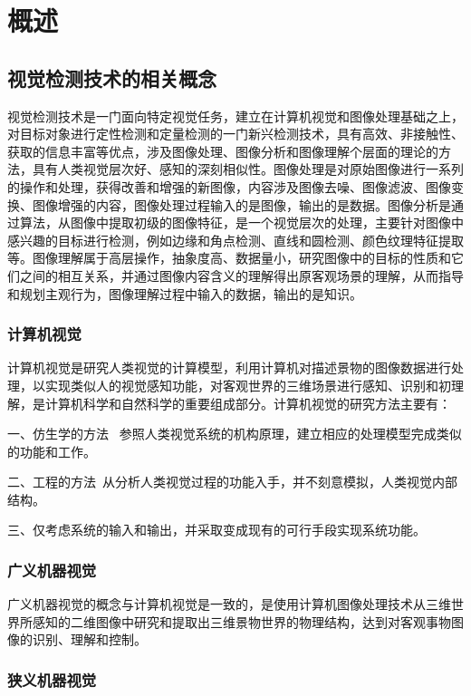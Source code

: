 {\chapter{概述}

\section{视觉检测技术的相关概念}
视觉检测技术\citep{yong.2013}是一门面向特定视觉任务，建立在计算机视觉和图像处理基础之上，对目标对象进行定性检测和定量检测的一门新兴检测技术，具有高效、非接触性、获取的信息丰富等优点，涉及图像处理、图像分析和图像理解个层面的理论的方法，具有人类视觉层次好、感知的深刻相似性。图像处理是对原始图像进行一系列的操作和处理，获得改善和增强的新图像，内容涉及图像去噪、图像滤波、图像变换、图像增强的内容，图像处理过程输入的是图像，输出的是数据。图像分析是通过算法，从图像中提取初级的图像特征，是一个视觉层次的处理，主要针对图像中感兴趣的目标进行检测，例如边缘和角点检测、直线和圆检测、颜色纹理特征提取等。图像理解属于高层操作，抽象度高、数据量小，研究图像中的目标的性质和它们之间的相互关系，并通过图像内容含义的理解得出原客观场景的理解，从而指导和规划主观行为，图像理解过程中输入的数据，输出的是知识。

\subsection{计算机视觉}

计算机视觉\citep{A.2017,zhang.2017}是研究人类视觉的计算模型，利用计算机对描述景物的图像数据进行处理，以实现类似人的视觉感知功能，对客观世界的三维场景进行感知、识别和初理解，是计算机科学和自然科学的重要组成部分。计算机视觉的研究方法主要有：

一、仿生学的方法~ 参照人类视觉系统的机构原理，建立相应的处理模型完成类似的功能和工作。

二、工程的方法~从分析人类视觉过程的功能入手，并不刻意模拟，人类视觉内部结构。

三、仅考虑系统的输入和输出，并采取变成现有的可行手段实现系统功能。

\subsection{广义机器视觉}

广义机器视觉的概念与计算机视觉是一致的，是使用计算机图像处理技术从三维世界所感知的二维图像中研究和提取出三维景物世界的物理结构，达到对客观事物图像的识别、理解和控制。

\subsection{狭义机器视觉}

}
